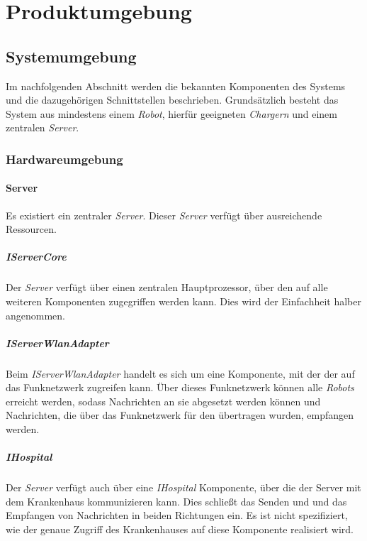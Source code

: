 \section{Produktumgebung}

  \subsection{Systemumgebung}
  Im nachfolgenden Abschnitt werden die bekannten Komponenten des Systems
  und die dazugehörigen Schnittstellen beschrieben. Grundsätzlich besteht
  das System aus mindestens einem \emph{Robot}, hierfür geeigneten
  \emph{Chargern} und einem zentralen \emph{Server}.

    \subsubsection{Hardwareumgebung}
    \paragraph{Server}\label{server}

    Es existiert ein zentraler \emph{Server}. Dieser \emph{Server} verfügt
    über ausreichende Ressourcen.

    \subparagraph{IServerCore}\label{iservercore}

    Der \emph{Server} verfügt über einen zentralen Hauptprozessor, über den
    auf alle weiteren Komponenten zugegriffen werden kann. Dies wird der
    Einfachheit halber angenommen.

    \subparagraph{IServerWlanAdapter}\label{iserverwlanadapter}

    Beim \emph{IServerWlanAdapter} handelt es sich um eine Komponente, mit der der 
    auf das Funknetzwerk zugreifen kann. Über dieses Funknetzwerk können alle
    \emph{Robots} erreicht werden, sodass Nachrichten an sie abgesetzt werden können
    und Nachrichten, die über das Funknetzwerk für den  übertragen wurden,
    empfangen werden.

    \subparagraph{IHospital}\label{ihospital}

    Der \emph{Server} verfügt auch über eine \emph{IHospital} Komponente, über die
    der Server mit dem Krankenhaus kommunizieren kann. Dies schließt das Senden und
    und das Empfangen von Nachrichten in beiden Richtungen ein. Es ist nicht spezifiziert,
    wie der genaue Zugriff des Krankenhauses auf diese Komponente realisiert wird.

